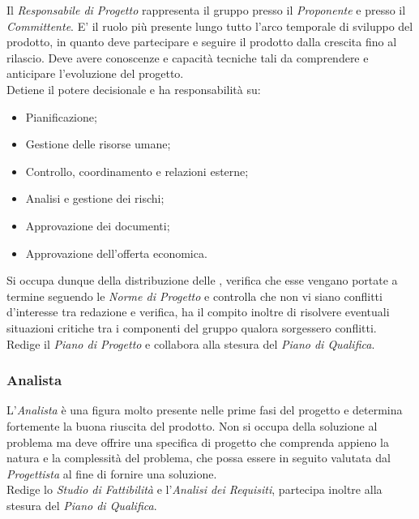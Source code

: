 \documentclass{scalatekids-article}
\begin{document}
Il \textit{Responsabile di Progetto} rappresenta il gruppo presso il \textit{Proponente}
e presso il \textit{Committente}. E' il ruolo più presente lungo tutto l'arco temporale di
sviluppo del prodotto, in quanto deve partecipare e seguire il prodotto dalla
crescita fino al rilascio. Deve avere conoscenze e capacità
tecniche tali da comprendere e anticipare l'evoluzione del progetto.\\
Detiene il potere decisionale e ha responsabilità su:
\begin{itemize}
\item Pianificazione;
\item Gestione delle risorse umane;
\item Controllo, coordinamento e relazioni esterne;
\item Analisi e gestione dei rischi;
\item Approvazione dei documenti;
\item Approvazione dell'offerta economica.
\end{itemize}
Si occupa dunque della distribuzione delle , verifica che esse vengano
portate a termine seguendo le \textit{Norme di Progetto} e controlla che non vi
siano conflitti d'interesse tra redazione e verifica, ha il compito inoltre di
risolvere eventuali situazioni critiche tra i componenti del gruppo qualora
sorgessero conflitti.\\ Redige il \textit{Piano di Progetto} e collabora alla
stesura del \textit{Piano di Qualifica}.

\subsubsection{Analista}

L'\textit{Analista} è una figura molto presente nelle prime fasi del progetto e
determina fortemente la buona riuscita del prodotto. Non si occupa della
soluzione al problema ma deve offrire una specifica di progetto che comprenda
appieno la natura e la complessità del problema, che possa essere in seguito
valutata dal \textit{Progettista} al fine di fornire una soluzione.\\ Redige lo
\textit{Studio di Fattibilità} e l'\textit{Analisi dei Requisiti}, partecipa
inoltre alla stesura del \textit{Piano di Qualifica}.
\end{document}
